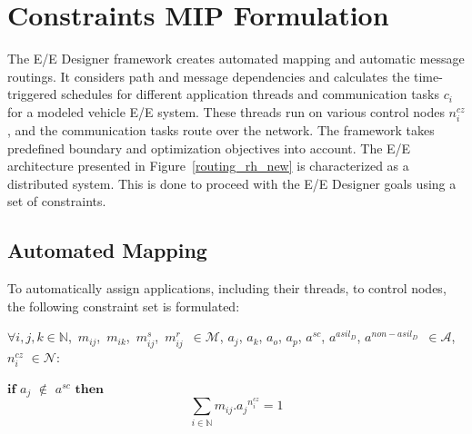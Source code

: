 






    \section{Constraints MIP Formulation}\label{constraintformul}
    The E/E Designer framework creates automated mapping and automatic message routings. It considers path and message dependencies and calculates the time-triggered schedules for different application threads and communication tasks $c_i$ for a modeled vehicle E/E system. These threads run on various control nodes $n_{i}^{cz}$, and the communication tasks route over the network. The framework takes predefined boundary and optimization objectives into account. The E/E architecture presented in Figure~\ref{routing_rh_new} is characterized as a distributed system. This is done to proceed with the E/E Designer goals using a set of constraints.
    
    \subsection{Automated Mapping}
    To automatically assign applications, including their threads, to control nodes, the following constraint set is formulated: \newline
    	
    	$\forall i, j, k \in \mathbb{N}$,~${m_{ij}}$,~${m_{ik}}$,~${m_{ij}^{s}}$,~$m_{ij}^{r}$~$\in\mathcal{M} $, ${a_j}$, ${a_k}$, ${a_o}$, ${a_p}$, $a^{sc}$, $a^{asil_D}$, $a^{non-asil_D}$~$\in\mathcal{A}$, ${n_{i}^{cz}}$  $\in \mathcal{N}$:\newline
    	    
     $\textbf{if}$ $a_j$ $\notin$ $a^{sc}$ $\textbf{then}$\newline	
    \begin{equation}
    	\sum_{i \in \mathbb{N}} {m_{ij}}.{a_j}^{n_{i}^{cz}} =1
    	\label{eq1}
    \end{equation}
    
    
    
